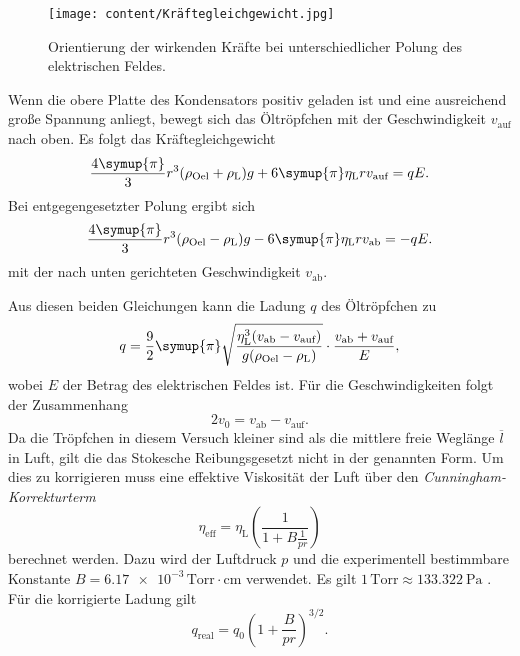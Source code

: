 \begin{figure}
    \centering
    \texttt{[image: content/Kräftegleichgewicht.jpg]}
    \caption{Orientierung der wirkenden Kräfte bei unterschiedlicher Polung des elektrischen Feldes. \cite{v503}}
    \label{fig:Kraeftegleichgewicht}
\end{figure}

Wenn die obere Platte des Kondensators positiv geladen ist und eine ausreichend große Spannung anliegt, bewegt sich das Öltröpfchen mit der Geschwindigkeit $v_\text{auf}$
nach oben. 
Es folgt das Kräftegleichgewicht
\begin{equation*}
    \label{eqn:Kraefte_1}
    \frac{4\symup{\pi}}{3}r^3(\rho_\text{Oel} + \rho_\text{L})g + 6 \symup{\pi} \eta_\text{L}r v_\text{auf} = qE.
\end{equation*}
Bei entgegengesetzter Polung ergibt sich 
\begin{equation*}
    \label{eqn:Kraefte_2}
    \frac{4\symup{\pi}}{3}r^3(\rho_\text{Oel}- \rho_\text{L})g - 6 \symup{\pi} \eta_\text{L}r v_{\text{ab}} = -qE.
\end{equation*}
mit der nach unten gerichteten Geschwindigkeit $v_\text{ab}$.

Aus diesen beiden Gleichungen kann die Ladung $q$ des Öltröpfchen zu 
\begin{equation}
    \label{eqn:q}
    q = \frac{9}{2} \symup{\pi} \sqrt{\frac{\eta_\text{L}^3(v_\text{ab} - v_\text{auf})}{g(\rho_\text{Oel}- \rho_\text{L})}} \cdot \frac{v_\text{ab} + v_\text{auf}}{E},
\end{equation}
wobei $E$ der Betrag des elektrischen Feldes ist. Für die Geschwindigkeiten folgt der Zusammenhang
\begin{equation}
    \label{eqn:v_0}
    2v_0 = v_\text{ab} - v_\text{auf}.
\end{equation}    
Da die Tröpfchen in diesem Versuch kleiner sind als die mittlere freie Weglänge $\overline{l}$ in Luft, gilt die das Stokesche Reibungsgesetzt nicht in der genannten Form.
Um dies zu korrigieren muss eine effektive Viskosität der Luft über den \textit{Cunningham-Korrekturterm}
\begin{equation}
    \label{eqn:n_eff}
    \eta_\text{eff} = \eta_\text{L} \left(\frac{1}{1 + B \frac{1}{pr}}\right)
\end{equation}
berechnet werden. Dazu wird der Luftdruck $p$ und die experimentell bestimmbare Konstante $B =  \num{6.17e-3}\, \text{Torr}\cdot\unit{\centi\metre}$ \cite{v503} verwendet.
Es gilt $1\,\text{Torr} \approx \qty{133.322}{\pascal}$ \cite{Ingenieurwissen}.
Für die korrigierte Ladung gilt
\begin{equation}
    \label{eqn:q_korrigiert}
    q_\text{real} = q_0 \left(1+ \frac{B}{pr}\right)^{3/2}.
\end{equation}
